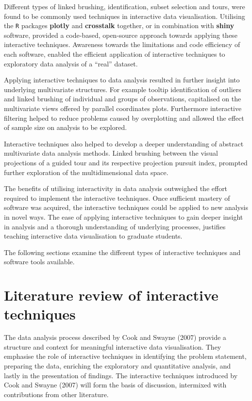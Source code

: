 \documentclass[]{book}
\theoremstyle{definition}
\theoremstyle{definition}
\theoremstyle{definition}
\theoremstyle{remark}
\begin{document}
Different types of linked brushing, identification, subset selection and
tours, were found to be commonly used techniques in interactive data
visualisation. Utilising the \texttt{R} packages \textbf{plotly} and
\textbf{crosstalk} together, or in combination with \textbf{shiny}
software, provided a code-based, open-source approach towards applying
these interactive techniques. Awareness towards the limitations and code
efficiency of each software, enabled the efficient application of
interactive techniques to exploratory data analysis of a ``real''
dataset.

Applying interactive techniques to data analysis resulted in further
insight into underlying multivariate structures. For example tooltip
identification of outliers and linked brushing of individual and groups
of observations, capitalised on the multivariate views offered by
parallel coordinates plots. Furthermore interactive filtering helped to
reduce problems caused by overplotting and allowed the effect of sample
size on analysis to be explored.

Interactive techniques also helped to develop a deeper understanding of
abstract multivariate data analysis methods. Linked brushing between the
visual projections of a guided tour and its respective projection
pursuit index, prompted further exploration of the multidimensional data
space.

The benefits of utilising interactivity in data analysis outweighed the
effort required to implement the interactive techniques. Once sufficient
mastery of software was acquired, the interactive techniques could be
applied to new analysis in novel ways. The ease of applying interactive
techniques to gain deeper insight in analysis and a thorough
understanding of underlying processes, justifies teaching interactive
data visualisation to graduate students.

The following sections examine the different types of interactive
techniques and software tools available.

\chapter{Literature review of interactive techniques}\label{techniques}

The data analysis process described by Cook and Swayne (2007) provide a
structure and context for meaningful interactive data visualisation.
They emphasise the role of interactive techniques in identifying the
problem statement, preparing the data, enriching the exploratory and
quantitative analysis, and lastly in the presentation of findings. The
interactive techniques introduced by Cook and Swayne (2007) will form
the basis of discussion, intermixed with contributions from other
literature.
\end{document}
